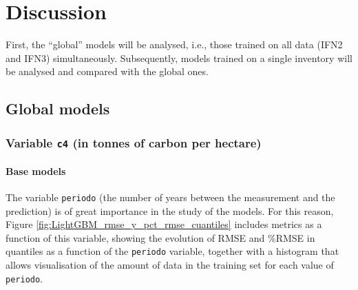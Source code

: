 \section{Discussion}
\label{sec:discusion}

First, the ``global'' models will be analysed, i.e., those trained on all data (IFN2 and IFN3) simultaneously. Subsequently, models trained on a single inventory will be analysed and compared with the global ones.


\subsection{Global models}

\subsubsection{Variable \texttt{c4} (in tonnes of carbon per hectare)}
\vspace{0.3cm}
\paragraph{Base models}

The variable \texttt{periodo} (the number of years between the measurement and the prediction) is of great importance in the study of the models. For this reason, Figure \ref{fig:LightGBM_rmse_y_pct_rmse_cuantiles} includes metrics as a function of this variable, showing the evolution of RMSE and \%RMSE in quantiles as a function of the \texttt{periodo} variable, together with a histogram that allows visualisation of the amount of data in the training set for each value of \texttt{periodo}.

